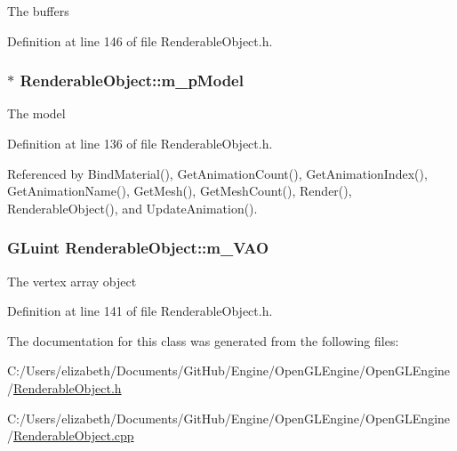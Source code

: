 The buffers 



Definition at line 146 of file Renderable\+Object.\+h.

\subsubsection[{\texorpdfstring{m\+\_\+p\+Model}{m_pModel}}]{$\ast$ Renderable\+Object\+::m\+\_\+p\+Model\hspace{0.3cm}{\ttfamily [private]}}\hypertarget{class_renderable_object_aab96dcc31d9e748645868c9449ae8cb6}{}\label{class_renderable_object_aab96dcc31d9e748645868c9449ae8cb6}


The model 



Definition at line 136 of file Renderable\+Object.\+h.



Referenced by Bind\+Material(), Get\+Animation\+Count(), Get\+Animation\+Index(), Get\+Animation\+Name(), Get\+Mesh(), Get\+Mesh\+Count(), Render(), Renderable\+Object(), and Update\+Animation().

\subsubsection[{\texorpdfstring{m\+\_\+\+V\+AO}{m_VAO}}]{\setlength{\rightskip}{0pt plus 5cm}G\+Luint Renderable\+Object\+::m\+\_\+\+V\+AO\hspace{0.3cm}{\ttfamily [private]}}\hypertarget{class_renderable_object_adf71c359139a157f0513f06a04d6a81d}{}\label{class_renderable_object_adf71c359139a157f0513f06a04d6a81d}


The vertex array object 



Definition at line 141 of file Renderable\+Object.\+h.



The documentation for this class was generated from the following files\+:\begin{DoxyCompactItemize}
\item 
C\+:/\+Users/elizabeth/\+Documents/\+Git\+Hub/\+Engine/\+Open\+G\+L\+Engine/\+Open\+G\+L\+Engine/\hyperlink{_renderable_object_8h}{Renderable\+Object.\+h}\item 
C\+:/\+Users/elizabeth/\+Documents/\+Git\+Hub/\+Engine/\+Open\+G\+L\+Engine/\+Open\+G\+L\+Engine/\hyperlink{_renderable_object_8cpp}{Renderable\+Object.\+cpp}\end{DoxyCompactItemize}
